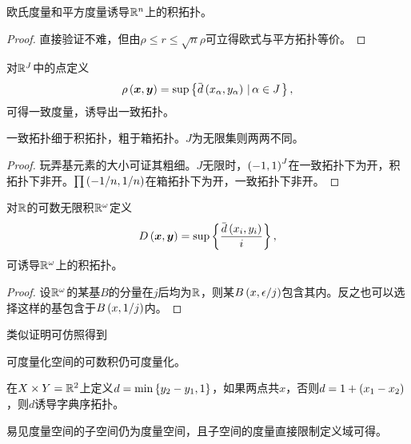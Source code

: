 \documentclass{ctexrep}
\begin{document}
  \begin{theorem}
    \label{thm:eucsqreq}
    欧氏度量和平方度量诱导$\mathbb{R}^n$上的积拓扑。
  \end{theorem}
  \begin{proof}
    直接验证不难，但由$\rho \le r \le \sqrt{n} \rho$可立得欧式与平方拓扑等价。
  \end{proof}
  \begin{definition}
    对$\mathbb{R}^J$中的点定义
    \[ \rho\pare{\vx,\vy} = \sup\setcond{\sbm{d}\pare{x_\alpha,y_\alpha}}{\alpha\in J}, \]
    可得一致度量，诱导出一致拓扑。
  \end{definition}
  \begin{theorem}
    一致拓扑细于积拓扑，粗于箱拓扑。$J$为无限集则两两不同。
  \end{theorem}
  \begin{proof}
    玩弄基元素的大小可证其粗细。$J$无限时，$\left(-1,1\right)^J$在一致拓扑下为开，积拓扑下非开。$\prod \left(-1/n,1/n\right)$在箱拓扑下为开，一致拓扑下非开。
  \end{proof}
  \begin{theorem}
    \label{thm:metricprodR}
    对$\mathbb{R}$的可数无限积$\mathbb{R}^\omega$定义
    \[ D\pare{\vx, \vy} = \sup\curb{\frac{\sbm{d}\pare{x_i,y_i}}{i}}, \]
    可诱导$\mathbb{R}^\omega$上的积拓扑。
  \end{theorem}
  \begin{proof}
    设$\mathbb{R}^\omega$的某基$B$的分量在$j$后均为$\mathbb{R}$，则某$B\left(x, \epsilon/j\right)$包含其内。反之也可以选择这样的基包含于$B\left(x, 1/j\right)$内。
  \end{proof}
  类似证明可仿照得到
  \begin{theorem}
    可度量化空间的可数积仍可度量化。
  \end{theorem}
  \begin{ex}
    在$X\times Y=\mathbb{R}^2$上定义$d=\min\left\{y_2-y_1,1\right\}$，如果两点共$x$，否则$d = 1+\left(x_1-x_2\right)$，则$d$诱导字典序拓扑。
  \end{ex}
  \begin{ex}
    易见度量空间的子空间仍为度量空间，且子空间的度量直接限制定义域可得。
  \end{ex}
\end{document}

